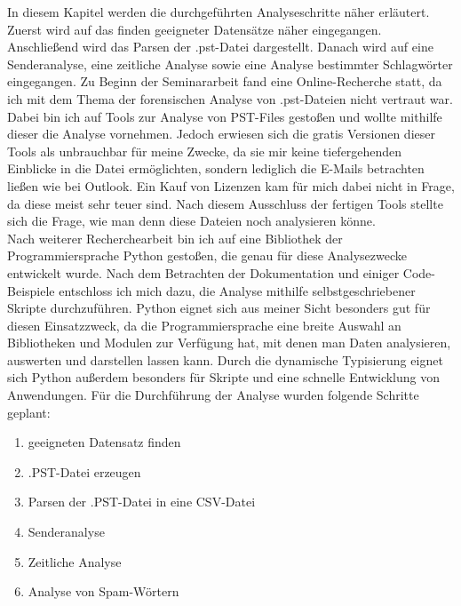 In diesem Kapitel werden die durchgeführten Analyseschritte näher erläutert. Zuerst wird auf das finden geeigneter Datensätze näher eingegangen. Anschließend wird das Parsen der .pst-Datei dargestellt. Danach wird auf eine Senderanalyse, eine zeitliche Analyse sowie eine Analyse bestimmter Schlagwörter eingegangen. Zu Beginn der Seminararbeit fand eine Online-Recherche statt, da ich mit dem Thema der forensischen Analyse von .pst-Dateien nicht vertraut war. Dabei bin ich auf Tools zur Analyse von PST-Files gestoßen und wollte mithilfe dieser die Analyse vornehmen. Jedoch erwiesen sich die gratis Versionen dieser Tools als unbrauchbar für meine Zwecke, da sie mir keine tiefergehenden Einblicke in die Datei ermöglichten, sondern lediglich die E-Mails betrachten ließen wie bei Outlook. Ein Kauf von Lizenzen kam für mich dabei nicht in Frage, da diese meist sehr teuer sind. Nach diesem Ausschluss der fertigen Tools stellte sich die Frage, wie man denn diese Dateien noch analysieren könne.\\

Nach weiterer Recherchearbeit bin ich auf eine Bibliothek der Programmiersprache Python gestoßen, die genau für diese Analysezwecke entwickelt wurde. Nach dem Betrachten der Dokumentation und einiger Code-Beispiele entschloss ich mich dazu, die Analyse mithilfe selbstgeschriebener Skripte durchzuführen. Python eignet sich aus meiner Sicht besonders gut für diesen Einsatzzweck, da die Programmiersprache eine breite Auswahl an Bibliotheken und Modulen zur Verfügung hat, mit denen man Daten analysieren, auswerten und darstellen lassen kann. Durch die dynamische Typisierung eignet sich Python außerdem besonders für Skripte und eine schnelle Entwicklung von Anwendungen. Für die Durchführung der Analyse wurden folgende Schritte geplant:

\begin{enumerate}
    \item geeigneten Datensatz finden
    \item .PST-Datei erzeugen 
    \item Parsen der .PST-Datei in eine CSV-Datei
    \item Senderanalyse
    \item Zeitliche Analyse
    \item Analyse von Spam-Wörtern
\end{enumerate}